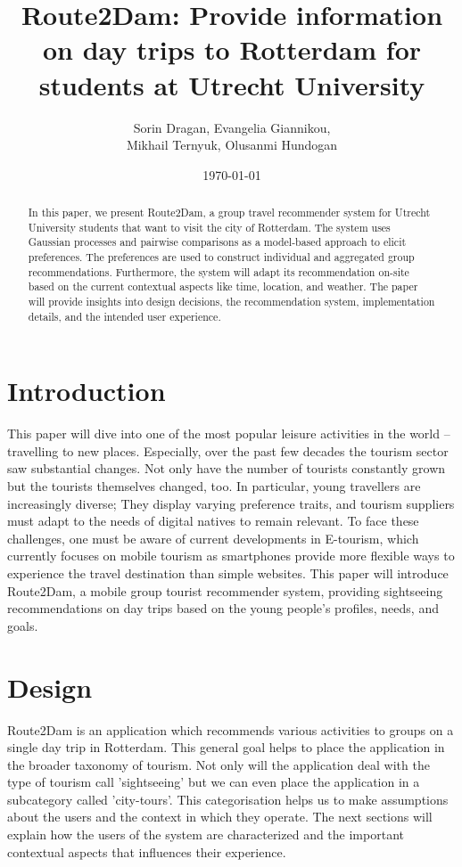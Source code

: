 \documentclass[11pt,a4paper,oneside]{article}
\title{\textbf{Route2Dam: Provide information on day trips to Rotterdam for students at Utrecht University}\newline \newline \newline}
\date{\today}
\author{Sorin Dragan, Evangelia Giannikou, \\Mikhail Ternyuk, Olusanmi Hundogan}
\begin{document}
\maketitle

\begin{abstract}
    In this paper, we present Route2Dam, a group travel recommender system for Utrecht University students that want to visit the city of Rotterdam. The system uses Gaussian processes and pairwise comparisons as a model-based approach to elicit preferences. 
    The preferences are used to construct individual and aggregated group recommendations. Furthermore, the system will adapt its recommendation on-site based on the current contextual aspects like time, location, and weather. The paper will provide insights into design decisions, the recommendation system, implementation details, and the intended user experience. 
\end{abstract}

\section{Introduction}
This paper will dive into one of the most popular leisure activities in the world -- travelling to new places.
Especially, over the past few decades the tourism sector saw substantial changes.\cite{smeral_StructuralViewTourism_2003}\cite{doi:10.18111/wtobarometereng.2020.18.1.1} Not only have the number of tourists constantly grown but the tourists themselves changed, too.\cite{OECD2020}
In particular, young travellers are increasingly diverse; They display varying preference traits, and tourism suppliers must adapt to the needs of digital natives to remain relevant.\cite{europeantravelcommission_StudyGenerationTravellers_2020}  To face these challenges, one must be aware of current developments in E-tourism, which currently focuses on mobile tourism as smartphones provide more flexible ways to experience the travel destination than simple websites.\cite{mobile_recommendation_systems} This paper will introduce Route2Dam, a mobile group tourist recommender system, providing sightseeing recommendations on day trips based on the young people's profiles, needs, and goals. 

\section{Design}
\label{sec:design}
Route2Dam is an application which recommends various activities to groups on a single day trip in Rotterdam. This general goal helps to place the application in the broader taxonomy of tourism. Not only will the application deal with the type of tourism \citeauthor{dunnross_SightseeingTouristsMotivation_1991} call 'sightseeing' but we can even place the application in a subcategory called 'city-tours'. This categorisation helps us to make assumptions about the users and the context in which they operate. The next sections will explain how the users of the system are characterized and the important contextual aspects that influences their experience. 
\end{document}
